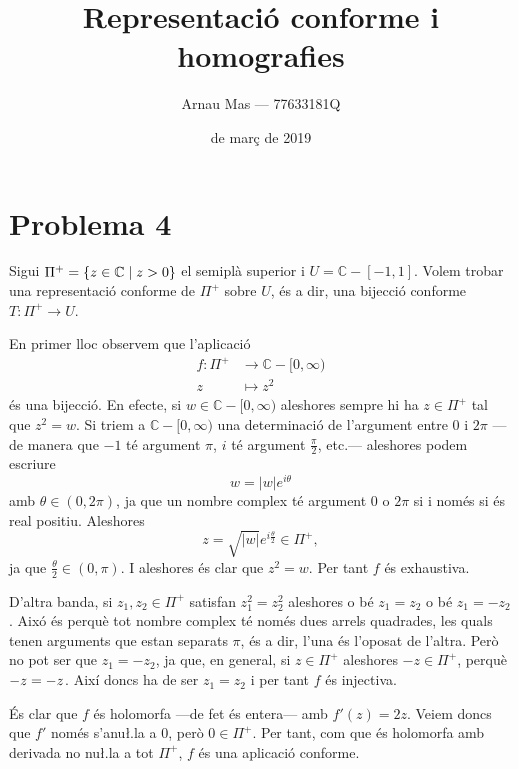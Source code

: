 \documentclass[12pt]{article}
\title{\sffamily {\bfseries Seminari 1:} Representació conforme i homografies}
\author{\sffamily Arnau Mas --- 77633181Q}
\date{\sffamily 21 de març de 2019}
\numberwithin{table}{section}
\numberwithin{figure}{section}
\numberwithin{equation}{section}
\newcommand{\C}{\mathbb{C}}
\let\Im\relax
\let\Re\relax
\DeclareMathOperator{\Im}{Im}
\DeclareMathOperator{\Re}{Re}
\newcommand{\abs}[1]{\lvert #1 \rvert}
\begin{document}
\maketitle

\section*{Problema 4}
Sigui \( \Pi^+ = \{ z \in \C \mid \Im{z} > 0 \} \) el semiplà superior i \( U = \C - [-1, 1] \). Volem trobar una representació conforme de \( \Pi^+ \) sobre \( U \), és a dir, una bijecció conforme \( T \colon \Pi^+ \to U \). 

En primer lloc observem que l'aplicació 
\begin{align*}
	f \colon \Pi^+ & \longrightarrow \C - [0, \infty) \\
	z & \longmapsto z^2
\end{align*}
és una bijecció. En efecte, si \( w \in \C - [0, \infty) \) aleshores sempre hi ha \( z \in \Pi^+ \) tal que \( z^2 = w \). Si triem a \( \C - [0, \infty) \) una determinació de l'argument entre 0 i \( 2\pi \) ---de manera que \( -1 \) té argument \( \pi \), \( i \) té argument \( \frac{\pi}{2} \), etc.--- aleshores podem escriure
\begin{equation*}
	w = \abs{w} e^{i\theta}
\end{equation*}
amb \( \theta \in (0, 2\pi) \), ja que un nombre complex té argument 0 o \( 2\pi \) si i només si és real positiu. Aleshores
\begin{equation*}
	z = \sqrt{\abs{w}}e^{i\frac{\theta}{2}} \in \Pi^+,
\end{equation*}
ja que \( \frac{\theta}{2} \in (0, \pi) \). I aleshores és clar que \( z^2 = w \). Per tant \( f \) és exhaustiva.

D'altra banda, si \( z_1, z_2 \in \Pi^+ \) satisfan \( z_1^2 = z_2^2 \) aleshores o bé \( z_1 = z_2 \) o bé \( z_1 = -z_2 \). Aixó és perquè tot nombre complex té només dues arrels quadrades, les quals tenen arguments que estan separats \( \pi \), és a dir, l'una és l'oposat de l'altra. Però no pot ser que \( z_1 = -z_2 \), ja que, en general, si \( z \in \Pi^+ \) aleshores \( -z \in \Pi^+ \), perquè \( \Re{-z} = -\Re{z} \). Així doncs ha de ser \( z_1 = z_2 \) i per tant \( f \) és injectiva.    

És clar que \( f \) és holomorfa ---de fet és entera--- amb \( f'(z) = 2z \). Veiem doncs que \( f' \) només s'anu\l.la a 0, però \( 0 \in \Pi^+ \). Per tant, com que és holomorfa amb derivada no nu\l.la a tot \( \Pi^+ \), \( f \) és una aplicació conforme.  
\end{document}
